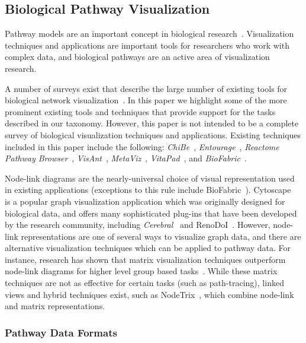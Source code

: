 \documentclass[twocolumn]{bmcart}%
\begin{document}
\subsection*{Biological Pathway Visualization}

Pathway models are an important concept in biological research~\cite{cairns2011regulation, luo2003targeting, reya2001stem}.
Visualization techniques and applications are important tools for researchers who work with complex data, and biological pathways are an active area of visualization research.

A number of surveys exist that describe the large number of existing tools for biological network visualization~\cite{Suderman2007tools,pavlopoulos2008survey,Gehlenborg2010omics}.
In this paper we highlight some of the more prominent existing tools and techniques that provide support for the tasks described in our taxonomy.
However, this paper is not intended to be a complete survey of biological visualization techniques and applications.
Existing techniques included in this paper include the following: \textit{ChiBe}~\cite{Babur2010chibe}, \textit{Entourage}~\cite{Lex2013entourage}, \textit{Reactome Pathway Browser}~\cite{croft2014reactome}, \textit{VisAnt}~\cite{hu2004visant}, \textit{MetaViz}~\cite{bourqui2007metabolic}, \textit{VitaPad}~\cite{holford2005vitapad}, and \textit{BioFabric}~\cite{Longabaugh2012biofabric}.

Node-link diagrams are the nearly-universal choice of visual representation used in existing applications (exceptions to this rule include BioFabric~\cite{Longabaugh2012biofabric}).
Cytoscape~\cite{cytoscape} is a popular graph visualization application which was originally designed for biological data, and offers many sophisticated plug-ins that have been developed by the research community, including \textit{Cerebral}~\cite{Barsky2008cerebral} and RenoDoI~\cite{Vehlow2015}.
However, node-link representations are one of several ways to visualize graph data, and there are alternative visualization techniques which can be applied to pathway data.
For instance, research has shown that matrix visualization techniques outperform node-link diagrams for higher level group based tasks~\cite{Ghoniem2004,Henry2007}.
While these matrix techniques are not as effective for certain tasks (such as path-tracing), linked views and hybrid techniques exist, such as NodeTrix~\cite{NodeTrix2007}, which combine node-link and matrix representations.

\subsubsection*{Pathway Data Formats}
\end{document}
